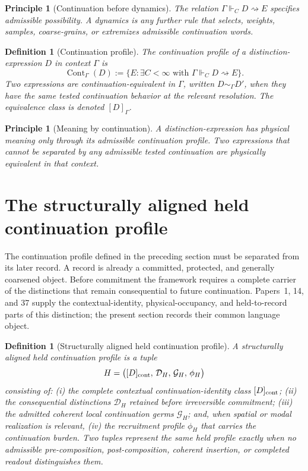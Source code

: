 \documentclass[11pt]{article}
\newtheorem{definition}[theorem]{Definition}
\newtheorem{principle}[theorem]{Principle}
\theoremstyle{remark}
\newcommand{\G}{\Gamma}
\newcommand{\entails}{\Vdash}
\newcommand{\goes}{\rightsquigarrow}
\newcommand{\Cont}{\operatorname{Cont}}
\begin{document}
\begin{principle}[Continuation before dynamics]
The relation \(\G\entails_C D\goes E\) specifies admissible possibility.  A dynamics is any further rule that selects, weights, samples, coarse-grains, or extremizes admissible continuation words.
\end{principle}

\begin{definition}[Continuation profile]
The continuation profile of a distinction-expression \(D\) in context \(\G\) is
\[
        \Cont_\G(D):=\{E:\exists C<\infty\text{ with }\G\entails_C D\goes E\}.
\]
Two expressions are continuation-equivalent in \(\G\), written \(D\sim_\G D'\), when they have the same tested continuation behavior at the relevant resolution.  The equivalence class is denoted \([D]_\G\).
\end{definition}

\begin{principle}[Meaning by continuation]
A distinction-expression has physical meaning only through its admissible continuation profile.  Two expressions that cannot be separated by any admissible tested continuation are physically equivalent in that context.
\end{principle}


\section{The structurally aligned held continuation profile}\label{sec:held-profile}

The continuation profile defined in the preceding section must be separated from its later record.  A record is already a committed, protected, and generally coarsened object.  Before commitment the framework requires a complete carrier of the distinctions that remain consequential to future continuation.  Papers~1, 14, and 37 supply the contextual-identity, physical-occupancy, and held-to-record parts of this distinction; the present section records their common language object.

\begin{definition}[Structurally aligned held continuation profile]
A \emph{structurally aligned held continuation profile} is a tuple
\[
        H=\bigl([D]_{\rm cont},\,\mathcal D_H,\,\mathcal G_H,\,\phi_H\bigr)
\]
consisting of: (i) the complete contextual continuation-identity class \([D]_{\rm cont}\); (ii) the consequential distinctions \(\mathcal D_H\) retained before irreversible commitment; (iii) the admitted coherent local continuation germs \(\mathcal G_H\); and, when spatial or modal realization is relevant, (iv) the recruitment profile \(\phi_H\) that carries the continuation burden.  Two tuples represent the same held profile exactly when no admissible pre-composition, post-composition, coherent insertion, or completed readout distinguishes them.
\end{definition}
\end{document}
